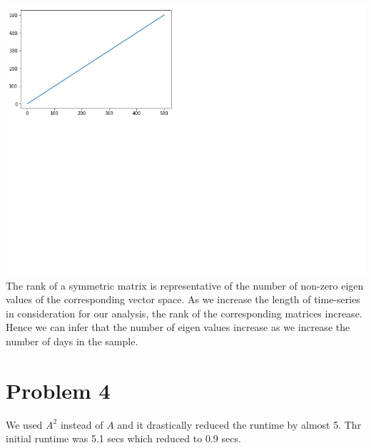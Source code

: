 \documentclass[twoside,11pt]{article}
\begin{document}
\includegraphics{graph_q3.png}
The rank of a symmetric matrix is representative of the number of non-zero eigen values of the corresponding vector space. As we increase the length of time-series in consideration for our analysis, the rank of the corresponding matrices increase. Hence we can infer that the number of eigen values increase as we increase the number of days in the sample.

\section*{Problem 4}
We used	$A^2$ instead of $A$ and it drastically reduced the runtime by almost 5. Thr initial runtime was 5.1 secs which reduced to 0.9 secs.
\end{document}
